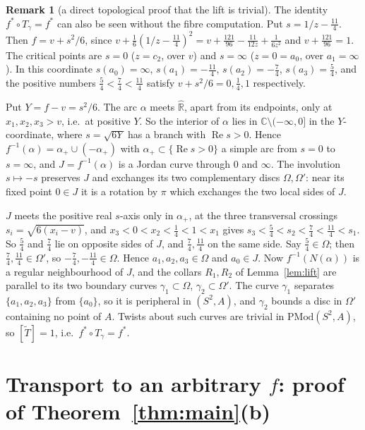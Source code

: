 \documentclass[11pt]{article}
\theoremstyle{definition}
\newtheorem{remark}[proposition]{Remark}
\newcommand{\PMod}{\mathrm{PMod}}
\newcommand{\Rh}{\hat{\mathbb R}}
\newcommand{\Rea}{\operatorname{Re}}
\begin{document}
\begin{remark}[a direct topological proof that the lift is trivial]
The identity $f^*\circ T_\gamma=f^*$ can also be seen without the fibre computation. Put $s=1/z-\tfrac{11}4$. Then $f=v+s^2/6$, since $v+\tfrac16(1/z-\tfrac{11}4)^2=v+\tfrac{121}{96}-\tfrac{11}{12z}+\tfrac1{6z^2}$ and $v+\tfrac{121}{96}=1$. The critical points are $s=0$ ($z=c_2$, over $v$) and $s=\infty$ ($z=0=a_0$, over $a_1=\infty$). In this coordinate $s(a_0)=\infty$, $s(a_1)=-\tfrac{11}4$, $s(a_2)=-\tfrac74$, $s(a_3)=\tfrac54$, and the positive numbers $\tfrac54<\tfrac74<\tfrac{11}4$ satisfy $v+s^2/6=0,\tfrac14,1$ respectively.

Put $Y=f-v=s^2/6$. The arc $\alpha$ meets $\Rh$, apart from its endpoints, only at $x_1,x_2,x_3>v$, i.e.\ at positive $Y$. So the interior of $\alpha$ lies in $\mathbb C\setminus(-\infty,0]$ in the $Y$-coordinate, where $s=\sqrt{6Y}$ has a branch with $\Rea s>0$. Hence $f^{-1}(\alpha)=\alpha_+\cup(-\alpha_+)$ with $\alpha_+\subset\{\Rea s>0\}$ a simple arc from $s=0$ to $s=\infty$, and $J=f^{-1}(\alpha)$ is a Jordan curve through $0$ and $\infty$. The involution $s\mapsto-s$ preserves $J$ and exchanges its two complementary discs $\Omega,\Omega'$: near its fixed point $0\in J$ it is a rotation by $\pi$ which exchanges the two local sides of $J$.

$J$ meets the positive real $s$-axis only in $\alpha_+$, at the three transversal crossings $s_i=\sqrt{6(x_i-v)}$, and $x_3<0<x_2<\tfrac14<1<x_1$ gives $s_3<\tfrac54<s_2<\tfrac74<\tfrac{11}4<s_1$. So $\tfrac54$ and $\tfrac74$ lie on opposite sides of $J$, and $\tfrac74,\tfrac{11}4$ on the same side. Say $\tfrac54\in\Omega$; then $\tfrac74,\tfrac{11}4\in\Omega'$, so $-\tfrac74,-\tfrac{11}4\in\Omega$. Hence $a_1,a_2,a_3\in\Omega$ and $a_0\in J$. Now $f^{-1}(N(\alpha))$ is a regular neighbourhood of $J$, and the collars $R_1,R_2$ of Lemma~\ref{lem:lift} are parallel to its two boundary curves $\gamma_1\subset\Omega$, $\gamma_2\subset\Omega'$. The curve $\gamma_1$ separates $\{a_1,a_2,a_3\}$ from $\{a_0\}$, so it is peripheral in $(S^2,A)$, and $\gamma_2$ bounds a disc in $\Omega'$ containing no point of $A$. Twists about such curves are trivial in $\PMod(S^2,A)$, so $[\tilde T]=1$, i.e.\ $f^*\circ T_\gamma=f^*$.
\end{remark}

\section{Transport to an arbitrary \texorpdfstring{$f$}{f}: proof of Theorem~\ref{thm:main}(b)}
\end{document}
